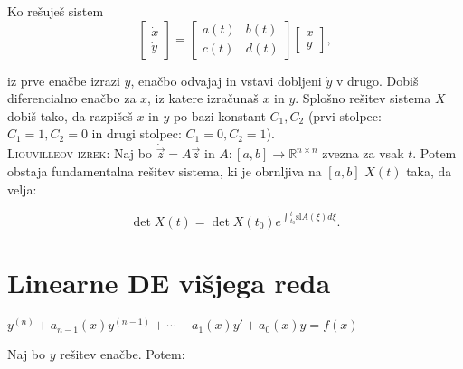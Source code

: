 \documentclass[8pt,a4paper]{amsart}
\theoremstyle{definition} %
\theoremstyle{plain} %
\let\oldint\int
\renewcommand{\int}{\oldint \!}
\newcommand{\R}{\mathbb R}
\begin{document}
%
%
Ko rešuješ sistem
$$
\begin{bmatrix} \dot{x} \\ \dot{y} \end{bmatrix} =
\begin{bmatrix} a(t) & b(t) \\ c(t) & d(t) \end{bmatrix}
\begin{bmatrix} x \\ y \end{bmatrix},
$$

iz prve enačbe izrazi $y$, enačbo odvajaj in vstavi dobljeni $\dot{y}$ v drugo. Dobiš diferencialno enačbo za $x$, iz katere izračunaš $x$ in $y$. Splošno rešitev sistema $X$ dobiš tako, da razpišeš $x$ in $y$ po bazi konstant $C_1,C_2$ (prvi stolpec: $C_1 = 1, C_2 = 0$ in drugi stolpec: $C_1 = 0, C_2 = 1$).
\\

\textsc{Liouvilleov izrek: }Naj bo $\dot{\vec{z}} = A \vec{z}$ in $A:[a,b] \rightarrow \R^{n\times n}$ zvezna za vsak $t$. Potem obstaja fundamentalna rešitev sistema, ki je obrnljiva na $[a,b]$ $X(t)$ taka, da velja:

$$
\det{X(t)} = \det{X(t_0)}e^{\int_{t_0}^t \text{sl}A(\xi)d\xi}.
$$

\section*{\textbf{Linearne DE višjega reda}}  %

$y^{(n)}+a_{n-1}(x)y^{(n-1)}+\cdots + a_1(x)y' + a_0(x)y = f(x)$

Naj bo $y$ rešitev enačbe. Potem:
\end{document}
